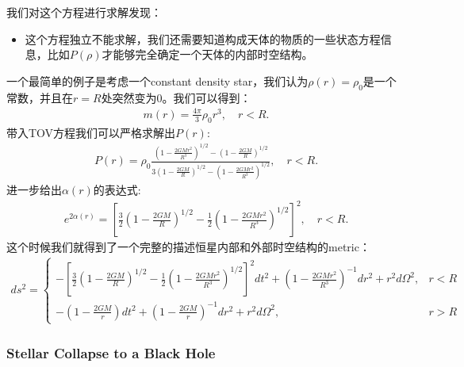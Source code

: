 \bigskip
{}

我们对这个方程进行求解发现：
\begin{itemize}
  \item 这个方程独立不能求解，我们还需要知道构成天体的物质的一些状态方程信息，比如$ P(\rho) $才能够完全确定一个天体的内部时空结构。
\end{itemize}
一个最简单的例子是考虑一个constant density star，我们认为$ \rho(r) = \rho_0 $是一个常数，并且在$
r = R $处突然变为0。我们可以得到：
\begin{align}
  m(r) = \frac{4\pi}{3} \rho_0 r^3, \quad r < R.
\end{align}
带入TOV方程我们可以严格求解出$ P(r) $:
\begin{align}
  P(r) = \rho_0 \frac{\left(1-\frac{2GM r^2}{R^3}\right)^{1/2} -
  \left(1-\frac{2GM}{R}\right)^{1/2}}{3\left(1-\frac{2GM}{R}\right)^{1/2}
  - \left(1-\frac{2GM r^2}{R^3}\right)^{1/2}}, \quad r < R.
\end{align}
进一步给出$ \alpha(r) $的表达式:
\begin{align}
  e^{2\alpha(r)} =
  \left[\frac{3}{2}\left(1-\frac{2GM}{R}\right)^{1/2} -
  \frac{1}{2}\left(1-\frac{2GMr^2}{R^3}\right)^{1/2}\right]^2, \quad r < R.
\end{align}
这个时候我们就得到了一个完整的描述恒星内部和外部时空结构的metric：
\begin{align}
  ds^2 =
  \begin{cases}
    -\left[\frac{3}{2}\left(1-\frac{2GM}{R}\right)^{1/2} -
    \frac{1}{2}\left(1-\frac{2GMr^2}{R^3}\right)^{1/2}\right]^2 dt^2
    + \left(1-\frac{2GMr^2}{R^3}\right)^{-1} dr^2 + r^2 d\Omega^2, & r < R \\
    -\left(1-\frac{2GM}{r}\right) dt^2 +
    \left(1-\frac{2GM}{r}\right)^{-1} dr^2 + r^2 d\Omega^2, & r > R
  \end{cases}
\end{align}

\subsubsection{Stellar Collapse to a Black Hole}


